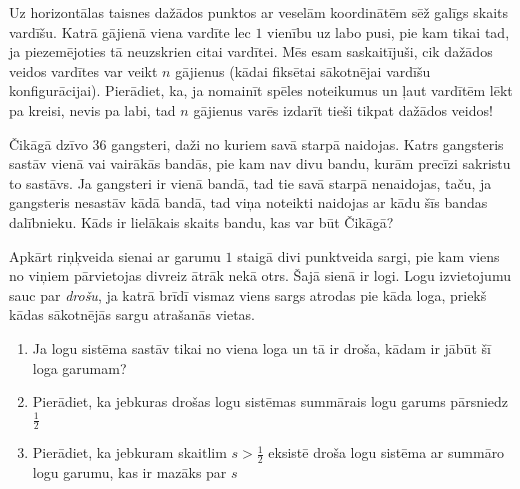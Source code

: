 

%



\renewcommand{\theenumi}{\alph{enumi}}



\noindent
 
\filbreak


\begin{problem}

Uz horizontālas taisnes dažādos punktos ar veselām koordinātēm sēž galīgs skaits vardīšu. Katrā gājienā viena vardīte lec $1$ vienību uz labo pusi, pie kam tikai tad, ja piezemējoties tā neuzskrien citai vardītei. Mēs esam saskaitījuši, cik dažādos veidos vardītes var veikt $n$ gājienus (kādai fiksētai sākotnējai vardīšu konfigurācijai). Pierādiet, ka, ja nomainīt spēles noteikumus un ļaut vardītēm lēkt pa kreisi, nevis pa labi, tad $n$ gājienus varēs izdarīt tieši tikpat dažādos veidos!  


\end{problem}

\begin{problem}
Čikāgā dzīvo $36$ gangsteri, daži no kuriem savā starpā naidojas. Katrs gangsteris sastāv vienā vai vairākās bandās, pie kam nav divu bandu, kurām precīzi sakristu to sastāvs. Ja gangsteri ir vienā bandā, tad tie savā starpā nenaidojas, taču, ja gangsteris nesastāv kādā bandā, tad viņa noteikti naidojas ar kādu šīs bandas dalībnieku.
Kāds ir lielākais skaits bandu, kas var būt Čikāgā? 


\end{problem}



\begin{problem}
Apkārt riņķveida sienai ar garumu $1$ staigā divi punktveida sargi, pie kam viens no viņiem pārvietojas divreiz ātrāk nekā otrs. Šajā sienā ir logi. Logu izvietojumu sauc par \textit{drošu}, ja katrā brīdī vismaz viens sargs atrodas pie kāda loga, priekš kādas sākotnējās sargu atrašanās vietas. 
\begin {enumerate}
\item Ja logu sistēma sastāv tikai no viena loga un tā ir droša, kādam ir jābūt šī loga garumam?
\item Pierādiet, ka jebkuras drošas logu sistēmas summārais logu garums pārsniedz $\frac{1}{2}$
\item Pierādiet, ka jebkuram skaitlim $s>\frac{1}{2}$ eksistē droša logu sistēma ar summāro logu garumu, kas ir mazāks par $s$
\end {enumerate}

\end{problem}



%

